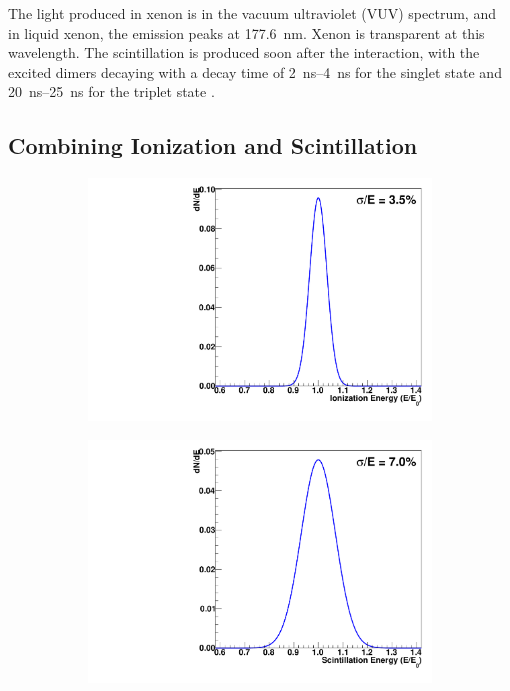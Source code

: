\documentclass[herrin-thesis.tex]{subfiles}
\begin{document}
The light produced in xenon is in the vacuum ultraviolet (VUV) spectrum, and in liquid xenon, the emission peaks at \SI{177.6}{\nm}. Xenon is transparent at this wavelength. The scintillation is produced soon after the interaction, with the excited dimers decaying with a decay time of \SIrange{2}{4}{\ns} for the singlet state and \SIrange{20}{25}{\ns} for the triplet state \cite{Aprile:2010uq}.

\subsection{Combining Ionization and Scintillation}
\label{sec:xe_combining_ion_and_scint}

\begin{figure}[htp]
\centering
\begin{subfigure}[c]{0.45\linewidth}
\includegraphics[width=\textwidth]{./plots/xe_anticorrelation_ioniz.pdf}
\end{subfigure}\hspace{0.05\linewidth}\hfill%
\begin{subfigure}[c]{0.45\linewidth}
\includegraphics[width=\textwidth]{./plots/xe_anticorrelation_scint.pdf}

\end{subfigure}
\end{figure}
\end{document}

